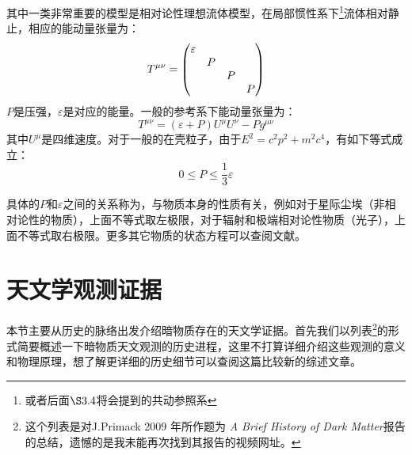 \documentclass{ctexart}
\newcommand{\dotemph}[1]{\CJKunderdot{#1}}
\begin{document}
	其中一类非常重要的模型是相对论性理想流体模型，在局部惯性系下\footnote{或者后面$\S 3.4$将会提到的共动参照系}流体相对静止，相应的能动量张量为：
	\begin{equation}
		T^{\mu\nu}=\mqty(\dmat{\varepsilon,P,P,P})
	\end{equation}
	$P$是压强，$\varepsilon$是对应的能量。一般的参考系下能动量张量为：
	\begin{equation}
		\label{eq:17}
		T^{\mu\nu}=(\varepsilon+P)U^\mu U^\nu-Pg^{\mu\nu}
	\end{equation}
	其中$U^\mu$是四维速度。对于一般的在壳粒子，由于$E^2=c^2p^2+m^2c^4$，有如下等式成立：
	\begin{equation}
		\label{eq:18}
		0\leq P\leq \frac{1}{3}\varepsilon
	\end{equation}

	具体的$P$和$\varepsilon$之间的关系称为\dotemph{状态方程}，与物质本身的性质有关，例如对于星际尘埃（非相对论性的物质），上面不等式取左极限，对于辐射和极端相对论性物质（光子），上面不等式取右极限。更多其它物质的状态方程可以查阅文献\cite{Linder1997FirstPO}。
	
	\section{天文学观测证据}
	本节主要从历史的脉络出发介绍暗物质存在的天文学证据。首先我们以列表\footnote{这个列表是对J.Primack 2009 年所作题为 \textit{A Brief History of Dark Matter}报告的总结，遗憾的是我未能再次找到其报告的视频网址。}的形式简要概述一下暗物质天文观测的历史进程，这里不打算详细介绍这些观测的意义和物理原理，想了解更详细的历史细节可以查阅这篇比较新的综述文章\cite{RevModPhys.90.045002}。
	
\end{document}
